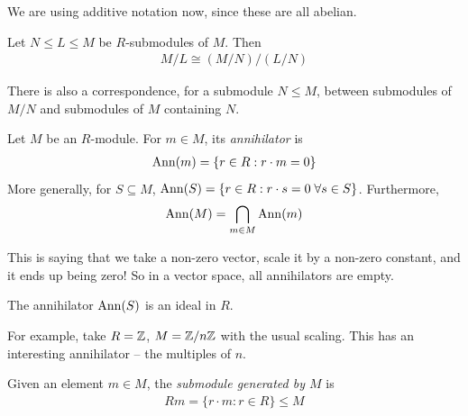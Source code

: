\documentclass{../template/note}
\begin{document}
    \begin{remark*}
        We are using additive notation now, since these are all abelian.
    \end{remark*}
    
    \begin{theorem}
        Let $N \leq L \leq M$ be $R$-submodules of $M$. Then
        \begin{align*}
            M/L \cong (M/N)/(L/N)
        \end{align*}
    \end{theorem}
    
    There is also a correspondence, for a submodule $N \leq M$, between submodules of $M/N$ and submodules of $M$ containing $N$.

    \begin{definition}[Annihilators]
        Let $M$ be an $R$-module. For $m \in M$, its \emph{annihilator} is
        \begin{align*}
            \operatorname{Ann}(m) = \{r \in R: r \cdot m = 0\}
        \end{align*}
        More generally, for $S \subseteq M$, $\operatorname{Ann}(S) = \{r \in R: r \cdot s = 0 \;\forall s \in S\}$. Furthermore,
        \begin{align*}
            \operatorname{Ann}(M) = \bigcap_{m\in M} \operatorname{Ann}(m)
        \end{align*}
    \end{definition}
    
    \begin{remark*}
        This is saying that we take a non-zero vector, scale it by a non-zero constant, and it ends up being zero! So in a vector space, all annihilators are empty.
    \end{remark*}

    \begin{remark*}
        The annihilator $\operatorname{Ann}(S)$ is an ideal in $R$.
    \end{remark*}
    
    \begin{example*}
        For example, take $R = \mathbb Z$, $M = \mathbb Z/n\mathbb Z$ with the usual scaling. This has an interesting annihilator -- the multiples of $n$.
    \end{example*}
    
    \begin{definition}
        Given an element $m \in M$, the \emph{submodule generated by $M$} is
        \begin{align*}
            Rm = \{r \cdot m: r \in R\} \leq M
        \end{align*}
    \end{definition}
    
\end{document}
